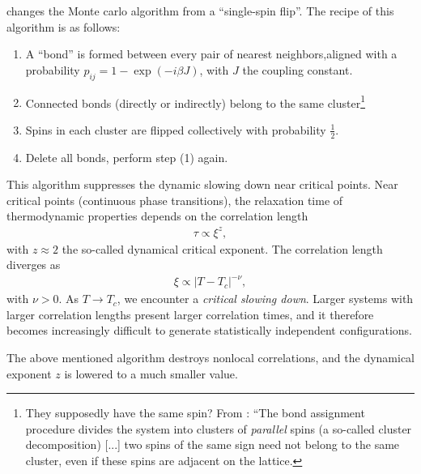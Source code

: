\cite{PhysRevLett.58.86} changes the Monte carlo
algorithm from a ``single-spin flip''. The recipe of this algorithm is as follows:

\begin{enumerate}
	\item A ``bond'' is formed between every pair of nearest neighbors,aligned with a probability $p_{ij} = 1 - \exp(-i\beta J)$, with $J$ the coupling constant.
	\item Connected bonds (directly or indirectly) belong to the same cluster\footnote{They supposedly have the same spin? From \cite{Luijten2006}: ``The bond assignment procedure divides the system into clusters of \textit{parallel} spins (a so-called cluster decomposition) [...] two spins of the same sign need not belong to the same cluster, even if these spins are adjacent on the lattice. }
	\item Spins in each cluster are flipped collectively with probability $\frac{1}{2}$. 
	\item Delete all bonds, perform step (1) again.
\end{enumerate}

This algorithm suppresses the dynamic slowing down near critical points. Near critical points (continuous phase transitions), the relaxation time of thermodynamic properties depends on the correlation length 
\begin{align}
	\tau \propto \xi ^z,
\end{align}
with $z\approx2$ the so-called dynamical critical exponent. The correlation length diverges as 
\begin{align}
	\xi \propto \lvert T - T_c \rvert ^{-\nu},
\end{align}
with $\nu > 0 $. As $T\to T_c$, we encounter a \textit{critical slowing down}. Larger systems with larger correlation lengths present larger correlation times, and it therefore becomes increasingly difficult to generate statistically independent configurations. 

The above mentioned algorithm destroys nonlocal correlations, and the dynamical exponent $z$ is lowered to a much smaller value. 
